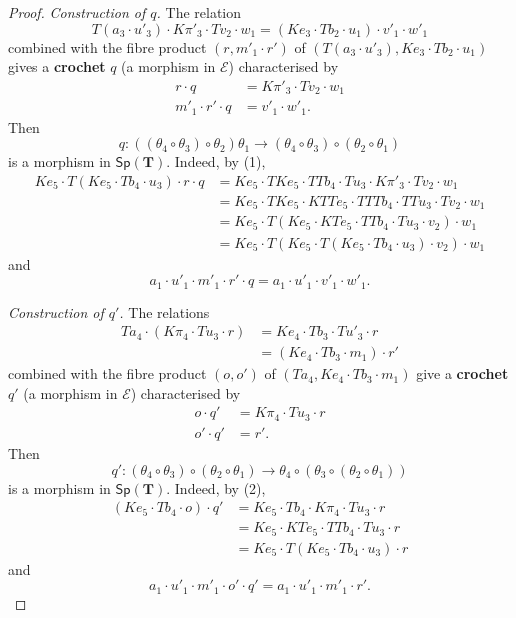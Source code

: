 \documentclass[fleqn]{article}
\newcommand{\oldpage}[1]{\marginpar{\footnotesize$\Big\vert$ \textit{p.~#1}}}
\newcommand{\unsure}[1]{{\color{purple}\textbf{#1}}}
\newcommand{\TT}{\mathbf{T}}
\newcommand{\cat}[1]{\mathcal{#1}}
\newcommand{\Cat}[1]{\mathsf{#1}}
\newcommand{\Sp}[1]{\Cat{Sp}(#1)}
\begin{document}
\begin{proof}
  \emph{Construction of $q$.}
  The relation
  \[
    T(a_3\cdot u'_3)\cdot K\pi'_3\cdot Tv_2\cdot w_1
    = (Ke_3\cdot Tb_2\cdot u_1)\cdot v'_1\cdot w'_1
  \]
  combined with the fibre product $(r,m'_1\cdot r')$ of $(T(a_3\cdot u'_3),Ke_3\cdot Tb_2\cdot u_1)$ gives a \unsure{crochet} $q$ (a morphism in $\cat{E}$) characterised by
  \[
    \begin{aligned}
      r\cdot q
      &= K\pi'_3\cdot Tv_2\cdot w_1
    \\m'_1\cdot r'\cdot q
      &= v'_1\cdot w'_1.
    \end{aligned}
    \tag{1}
  \]
  Then
  \[
    q\colon((\theta_4\circ\theta_3)\circ\theta_2)\theta_1
    \to (\theta_4\circ\theta_3)\circ(\theta_2\circ\theta_1)
  \]
  is a morphism in $\Sp{\TT}$.
  Indeed, by (1),
  \[
    \begin{aligned}
      Ke_5\cdot T(Ke_5\cdot Tb_4\cdot u_3)\cdot r\cdot q
      &= Ke_5\cdot TKe_5\cdot TTb_4\cdot Tu_3\cdot K\pi'_3\cdot Tv_2\cdot w_1
    \\&= Ke_5\cdot TKe_5\cdot KTTe_5\cdot TTTb_4\cdot TTu_3\cdot Tv_2\cdot w_1
    \\&= Ke_5\cdot T(Ke_5\cdot KTe_5\cdot TTb_4\cdot Tu_3\cdot v_2)\cdot w_1
    \\&= Ke_5\cdot T(Ke_5\cdot T(Ke_5\cdot Tb_4\cdot u_3)\cdot v_2)\cdot w_1
    \end{aligned}
  \]
  and
  \[
    a_1\cdot u'_1\cdot m'_1\cdot r'\cdot q
    = a_1\cdot u'_1\cdot v'_1\cdot w'_1.
  \]

  \medskip

  \emph{Construction of $q'$.}
  The relations
  \[
    \begin{aligned}
      Ta_4\cdot(K\pi_4\cdot Tu_3\cdot r)
      &= Ke_4\cdot Tb_3\cdot Tu'_3\cdot r
    \\&= (Ke_4\cdot Tb_3\cdot m_1)\cdot r'
    \end{aligned}
  \]
  combined with the fibre product $(o,o')$ of $(Ta_4,Ke_4\cdot Tb_3\cdot m_1)$ give a \unsure{crochet} $q'$ (a morphism in $\cat{E}$) characterised by
  \oldpage{253}
  \[
    \begin{aligned}
      o\cdot q'
      &= K\pi_4\cdot Tu_3\cdot r
    \\o'\cdot q'
      &= r'.
    \end{aligned}
    \tag{2}
  \]
  Then
  \[
    q'\colon(\theta_4\circ\theta_3)\circ(\theta_2\circ\theta_1)
    \to \theta_4\circ(\theta_3\circ(\theta_2\circ\theta_1))
  \]
  is a morphism in $\Sp{\TT}$.
  Indeed, by (2),
  \[
    \begin{aligned}
      (Ke_5\cdot Tb_4\cdot o)\cdot q'
      &= Ke_5\cdot Tb_4\cdot K\pi_4\cdot Tu_3\cdot r
    \\&= Ke_5\cdot KTe_5\cdot TTb_4\cdot Tu_3\cdot r
    \\&= Ke_5\cdot T(Ke_5\cdot Tb_4\cdot u_3)\cdot r
    \end{aligned}
  \]
  and
  \[
    a_1\cdot u'_1\cdot m'_1\cdot o'\cdot q'
    = a_1\cdot u'_1\cdot m'_1\cdot r'.
  \]


\end{proof}
\end{document}
